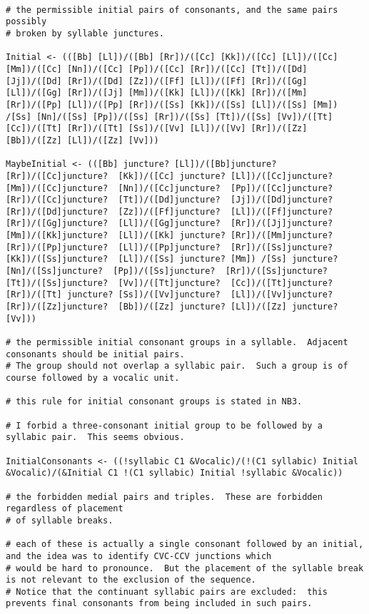 \documentclass{article}
\begin{document}
\begin{verbatim}

# the permissible initial pairs of consonants, and the same pairs possibly
# broken by syllable junctures.

Initial <- (([Bb] [Ll])/([Bb] [Rr])/([Cc] [Kk])/([Cc] [Ll])/([Cc] [Mm])/([Cc] [Nn])/([Cc] [Pp])/([Cc] [Rr])/([Cc] [Tt])/([Dd] [Jj])/([Dd] [Rr])/([Dd] [Zz])/([Ff] [Ll])/([Ff] [Rr])/([Gg] [Ll])/([Gg] [Rr])/([Jj] [Mm])/([Kk] [Ll])/([Kk] [Rr])/([Mm] [Rr])/([Pp] [Ll])/([Pp] [Rr])/([Ss] [Kk])/([Ss] [Ll])/([Ss] [Mm]) /[Ss] [Nn]/([Ss] [Pp])/([Ss] [Rr])/([Ss] [Tt])/([Ss] [Vv])/([Tt] [Cc])/([Tt] [Rr])/([Tt] [Ss])/([Vv] [Ll])/([Vv] [Rr])/([Zz] [Bb])/([Zz] [Ll])/([Zz] [Vv]))

MaybeInitial <- (([Bb] juncture? [Ll])/([Bb]juncture?  [Rr])/([Cc]juncture?  [Kk])/([Cc] juncture? [Ll])/([Cc]juncture?  [Mm])/([Cc]juncture?  [Nn])/([Cc]juncture?  [Pp])/([Cc]juncture?  [Rr])/([Cc]juncture?  [Tt])/([Dd]juncture?  [Jj])/([Dd]juncture?  [Rr])/([Dd]juncture?  [Zz])/([Ff]juncture?  [Ll])/([Ff]juncture?  [Rr])/([Gg]juncture?  [Ll])/([Gg]juncture?  [Rr])/([Jj]juncture?  [Mm])/([Kk]juncture?  [Ll])/([Kk] juncture? [Rr])/([Mm]juncture?  [Rr])/([Pp]juncture?  [Ll])/([Pp]juncture?  [Rr])/([Ss]juncture?  [Kk])/([Ss]juncture?  [Ll])/([Ss] juncture? [Mm]) /[Ss] juncture? [Nn]/([Ss]juncture?  [Pp])/([Ss]juncture?  [Rr])/([Ss]juncture?  [Tt])/([Ss]juncture?  [Vv])/([Tt]juncture?  [Cc])/([Tt]juncture?  [Rr])/([Tt] juncture? [Ss])/([Vv]juncture?  [Ll])/([Vv]juncture?  [Rr])/([Zz]juncture?  [Bb])/([Zz] juncture? [Ll])/([Zz] juncture? [Vv]))

# the permissible initial consonant groups in a syllable.  Adjacent consonants should be initial pairs.
# The group should not overlap a syllabic pair.  Such a group is of course followed by a vocalic unit.

# this rule for initial consonant groups is stated in NB3.

# I forbid a three-consonant initial group to be followed by a syllabic pair.  This seems obvious.

InitialConsonants <- ((!syllabic C1 &Vocalic)/(!(C1 syllabic) Initial &Vocalic)/(&Initial C1 !(C1 syllabic) Initial !syllabic &Vocalic))

# the forbidden medial pairs and triples.  These are forbidden regardless of placement
# of syllable breaks.

# each of these is actually a single consonant followed by an initial, and the idea was to identify CVC-CCV junctions which
# would be hard to pronounce.  But the placement of the syllable break is not relevant to the exclusion of the sequence.
# Notice that the continuant syllabic pairs are excluded:  this prevents final consonants from being included in such pairs.


\end{verbatim}
\end{document}
